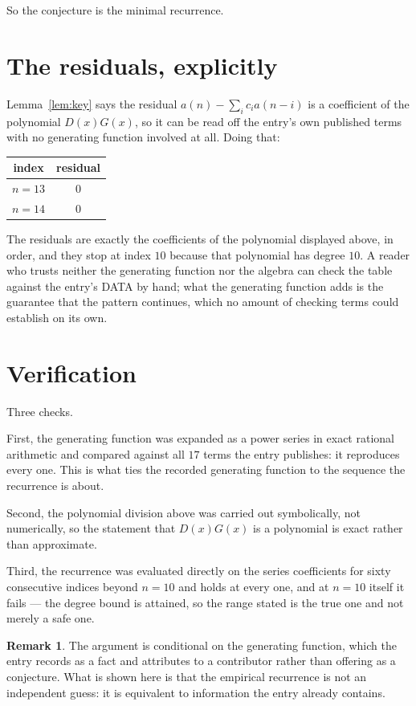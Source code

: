 \documentclass[11pt,a4paper]{article}
\theoremstyle{plain}
\theoremstyle{definition}
\newtheorem{remark}[theorem]{Remark}
\begin{document}
So the conjecture is the minimal recurrence.

\section{The residuals, explicitly}

Lemma~\ref{lem:key} says the residual $a(n)-\sum_ic_ia(n-i)$ is a coefficient of the
polynomial $D(x)G(x)$, so it can be read off the entry's own published terms with no
generating function involved at all. Doing that:
\begin{center}
\begin{tabular}{cc}
index & residual \\ \hline
$n=13$ & $0$ \\
$n=14$ & $0$
\end{tabular}
\end{center}
The residuals are exactly the coefficients of the polynomial displayed above, in order, and
they stop at index $10$ because that polynomial has degree $10$. A reader who trusts
neither the generating function nor the algebra can check the table against the entry's DATA
by hand; what the generating function adds is the guarantee that the pattern continues, which
no amount of checking terms could establish on its own.

\section{Verification}

Three checks.

First, the generating function was expanded as a power series in exact rational arithmetic and
compared against all $17$ terms the entry publishes: it reproduces every one. This is
what ties the recorded generating function to the sequence the recurrence is about.

Second, the polynomial division above was carried out symbolically, not numerically, so the
statement that $D(x)G(x)$ is a polynomial is exact rather than approximate.

Third, the recurrence was evaluated directly on the series coefficients for sixty consecutive
indices beyond $n=10$ and holds at every one, and at $n=10$ itself it fails --- the
degree bound is attained, so the range stated is the true one and not merely a safe one.

\begin{remark}
The argument is conditional on the generating function, which the entry records as a fact and
attributes to a contributor rather than offering as a conjecture. What is shown here is that
the empirical recurrence is not an independent guess: it is equivalent to information the
entry already contains.
\end{remark}
\end{document}
